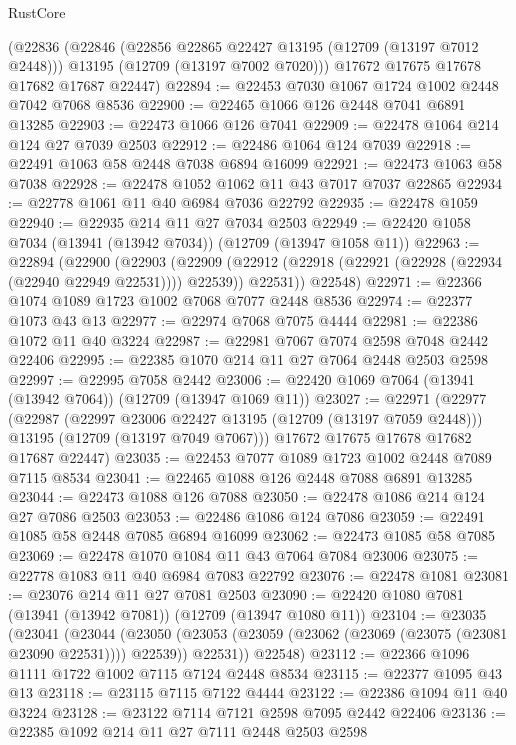 \begin{lexlean}{RustCore}
\begin{coremodule}
    (@22836
      (@22846
        (@22856 @22865 @22427 @13195 (@12709 (@13197 @7012 @2448)))
        @13195
        (@12709 (@13197 @7002 @7020)))
      @17672
      @17675
      @17678
      @17682
      @17687
      @22447)
@22894 := @22453 @7030 @1067 @1724 @1002 @2448 @7042 @7068 @8536
@22900 := @22465 @1066 @126 @2448 @7041 @6891 @13285
@22903 := @22473 @1066 @126 @7041
@22909 := @22478 @1064 @214 @124 @27 @7039 @2503
@22912 := @22486 @1064 @124 @7039
@22918 := @22491 @1063 @58 @2448 @7038 @6894 @16099
@22921 := @22473 @1063 @58 @7038
@22928 := @22478 @1052 @1062 @11 @43 @7017 @7037 @22865
@22934 := @22778 @1061 @11 @40 @6984 @7036 @22792
@22935 := @22478 @1059
@22940 := @22935 @214 @11 @27 @7034 @2503
@22949 := @22420 @1058 @7034 (@13941 (@13942 @7034)) (@12709 (@13947 @1058 @11))
@22963 := @22894
    (@22900
      (@22903
        (@22909 (@22912 (@22918 (@22921 (@22928 (@22934 (@22940 @22949 @22531)))) @22539)) @22531))
      @22548)
@22971 := @22366 @1074 @1089 @1723 @1002 @7068 @7077 @2448 @8536
@22974 := @22377 @1073 @43 @13
@22977 := @22974 @7068 @7075 @4444
@22981 := @22386 @1072 @11 @40 @3224
@22987 := @22981 @7067 @7074 @2598 @7048 @2442 @22406
@22995 := @22385 @1070 @214 @11 @27 @7064 @2448 @2503 @2598
@22997 := @22995 @7058 @2442
@23006 := @22420 @1069 @7064 (@13941 (@13942 @7064)) (@12709 (@13947 @1069 @11))
@23027 := @22971
    (@22977
      (@22987
        (@22997 @23006 @22427 @13195 (@12709 (@13197 @7059 @2448)))
        @13195
        (@12709 (@13197 @7049 @7067)))
      @17672
      @17675
      @17678
      @17682
      @17687
      @22447)
@23035 := @22453 @7077 @1089 @1723 @1002 @2448 @7089 @7115 @8534
@23041 := @22465 @1088 @126 @2448 @7088 @6891 @13285
@23044 := @22473 @1088 @126 @7088
@23050 := @22478 @1086 @214 @124 @27 @7086 @2503
@23053 := @22486 @1086 @124 @7086
@23059 := @22491 @1085 @58 @2448 @7085 @6894 @16099
@23062 := @22473 @1085 @58 @7085
@23069 := @22478 @1070 @1084 @11 @43 @7064 @7084 @23006
@23075 := @22778 @1083 @11 @40 @6984 @7083 @22792
@23076 := @22478 @1081
@23081 := @23076 @214 @11 @27 @7081 @2503
@23090 := @22420 @1080 @7081 (@13941 (@13942 @7081)) (@12709 (@13947 @1080 @11))
@23104 := @23035
    (@23041
      (@23044
        (@23050 (@23053 (@23059 (@23062 (@23069 (@23075 (@23081 @23090 @22531)))) @22539)) @22531))
      @22548)
@23112 := @22366 @1096 @1111 @1722 @1002 @7115 @7124 @2448 @8534
@23115 := @22377 @1095 @43 @13
@23118 := @23115 @7115 @7122 @4444
@23122 := @22386 @1094 @11 @40 @3224
@23128 := @23122 @7114 @7121 @2598 @7095 @2442 @22406
@23136 := @22385 @1092 @214 @11 @27 @7111 @2448 @2503 @2598

\end{coremodule}
\end{lexlean}
